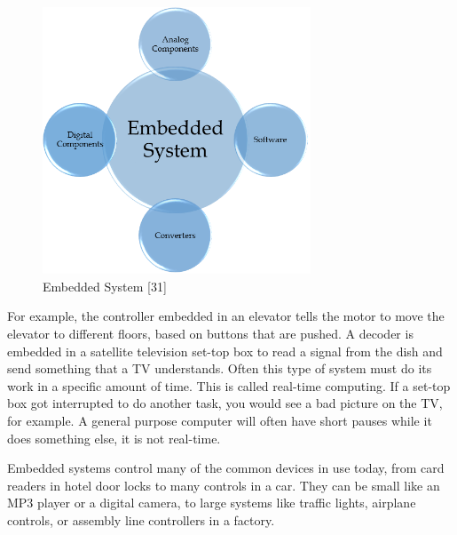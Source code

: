 \documentclass[twoside,a4paper,16pt]{book}
\begin{document}
{{ \begin{figure}[ht!]
 	\begin{center}
 		\includegraphics[width=8.0cm]{6.png}
 		\caption{Embedded System [31]}
 	\end{center}
 \end{figure}
For example, the controller embedded in an elevator tells the motor to move the elevator to different floors, based on buttons that are pushed. A decoder is embedded in a satellite television set-top box to read a signal from the dish and send something that a TV understands. Often this type of system must do its work in a specific amount of time. This is called real-time computing. If a set-top box got interrupted to do another task, you would see a bad picture on the TV, for example. A general purpose computer will often have short pauses while it does something else, it is not real-time.

Embedded systems control many of the common devices in use today, from card readers in hotel door locks to many controls in a car. They can be small like an MP3 player or a digital camera, to large systems like traffic lights, airplane controls, or assembly line controllers in a factory.
}}
\end{document}
